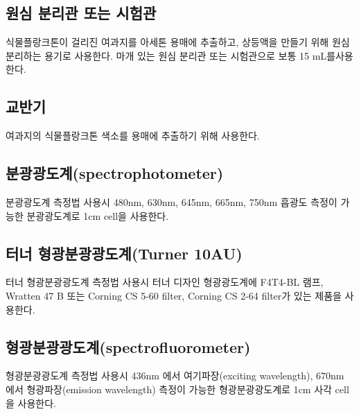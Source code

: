 \documentclass[
]{book}
\begin{document}
\hypertarget{uxc6d0uxc2ec-uxbd84uxb9acuxad00-uxb610uxb294-uxc2dcuxd5d8uxad00}{%
\subsection{원심 분리관 또는 시험관}\label{uxc6d0uxc2ec-uxbd84uxb9acuxad00-uxb610uxb294-uxc2dcuxd5d8uxad00}}

식물플랑크톤이 걸리진 여과지를 아세톤 용매에 추출하고, 상등액을 만들기 위해 원심분리하는 용기로 사용한다. 마개 있는 원심 분리관 또는 시험관으로 보통 15 mL를사용한다.

\hypertarget{uxad50uxbc18uxae30}{%
\subsection{교반기}\label{uxad50uxbc18uxae30}}

여과지의 식물플랑크톤 색소를 용매에 추출하기 위해 사용한다.

\hypertarget{uxbd84uxad11uxad11uxb3c4uxacc4spectrophotometer}{%
\subsection{분광광도계(spectrophotometer)}\label{uxbd84uxad11uxad11uxb3c4uxacc4spectrophotometer}}

분광광도계 측정법 사용시 480nm, 630nm, 645nm, 665nm, 750nm 흡광도 측정이 가능한 분광광도계로 1cm cell을 사용한다.

\hypertarget{uxd130uxb108-uxd615uxad11uxbd84uxad11uxad11uxb3c4uxacc4turner-10au}{%
\subsection{터너 형광분광광도계(Turner 10AU)}\label{uxd130uxb108-uxd615uxad11uxbd84uxad11uxad11uxb3c4uxacc4turner-10au}}

터너 형광분광광도계 측정법 사용시 터너 디자인 형광광도계에 F4T4-BL 램프, Wratten 47 B 또는 Corning CS 5-60 filter, Corning CS 2-64 filter가 있는 제품을 사용한다.

\hypertarget{uxd615uxad11uxbd84uxad11uxad11uxb3c4uxacc4spectrofluorometer}{%
\subsection{형광분광광도계(spectrofluorometer)}\label{uxd615uxad11uxbd84uxad11uxad11uxb3c4uxacc4spectrofluorometer}}

형광분광광도계 측정법 사용시 436nm 에서 여기파장(exciting wavelength), 670nm 에서 형광파장(emission wavelength) 측정이 가능한 형광분광광도계로 1cm 사각 cell을 사용한다.
\end{document}
